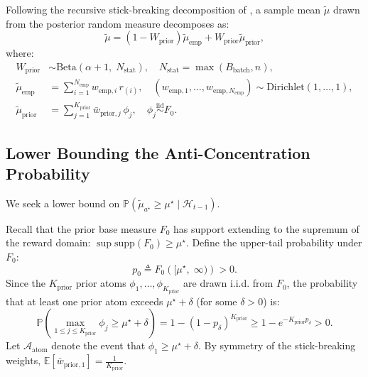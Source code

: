 \documentclass[twoside]{article}
\begin{document}
Following the recursive stick-breaking decomposition of \citet{vashishtha2025leveraging}, a sample mean $\tilde{\mu}$ drawn from the posterior random measure decomposes as:
\begin{equation}
\tilde{\mu} = (1 - W_{\text{prior}}) \tilde{\mu}_{\text{emp}} + W_{\text{prior}} \tilde{\mu}_{\text{prior}},
\end{equation}
where:
\begin{align}
W_{\text{prior}} &\sim \text{Beta}(\alpha + 1, \; N_{\text{stat}}), \quad N_{\text{stat}} = \max(B_{\text{batch}}, n), \\
\tilde{\mu}_{\text{emp}} &= \sum_{i=1}^{N_{\text{emp}}} w_{\text{emp}, i} \, r_{(i)}, \quad (w_{\text{emp}, 1}, \dots, w_{\text{emp}, N_{\text{emp}}}) \sim \text{Dirichlet}(1, \dots, 1), \\
\tilde{\mu}_{\text{prior}} &= \sum_{j=1}^{K_{\text{prior}}} \bar{w}_{\text{prior}, j} \, \phi_j, \quad \phi_j \stackrel{\text{iid}}{\sim} F_0.
\end{align}

\subsection{Lower Bounding the Anti-Concentration Probability}
We seek a lower bound on $\mathbb{P}\left( \tilde{\mu}_{a^\star} \ge \mu^\star \mid \mathcal{H}_{t-1} \right)$.

Recall that the prior base measure $F_0$ has support extending to the supremum of the reward domain: $\sup \text{supp}(F_0) \ge \mu^\star$. Define the upper-tail probability under $F_0$:
\begin{equation}
p_0 \triangleq F_0\left( [\mu^\star, \; \infty) \right) > 0.
\end{equation}
Since the $K_{\text{prior}}$ prior atoms $\phi_1, \dots, \phi_{K_{\text{prior}}}$ are drawn i.i.d. from $F_0$, the probability that at least one prior atom exceeds $\mu^\star + \delta$ (for some $\delta > 0$) is:
\begin{equation}
\mathbb{P}\left( \max_{1 \le j \le K_{\text{prior}}} \phi_j \ge \mu^\star + \delta \right) = 1 - (1 - p_\delta)^{K_{\text{prior}}} \ge 1 - e^{- K_{\text{prior}} p_\delta} > 0.
\end{equation}
Let $\mathcal{A}_{\text{atom}}$ denote the event that $\phi_1 \ge \mu^\star + \delta$. By symmetry of the stick-breaking weights, $\mathbb{E}[\bar{w}_{\text{prior}, 1}] = \frac{1}{K_{\text{prior}}}$.
\end{document}
